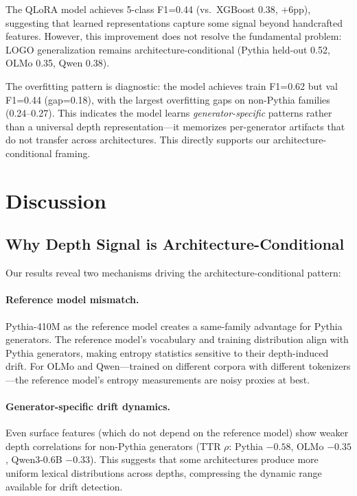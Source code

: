 \documentclass[11pt,a4paper]{article}
\begin{document}
The QLoRA model achieves 5-class F1=0.44 (vs.\ XGBoost 0.38, $+$6pp), suggesting that learned representations capture some signal beyond handcrafted features. However, this improvement does not resolve the fundamental problem: LOGO generalization remains architecture-conditional (Pythia held-out 0.52, OLMo 0.35, Qwen 0.38).

The overfitting pattern is diagnostic: the model achieves train F1=0.62 but val F1=0.44 (gap=0.18), with the largest overfitting gaps on non-Pythia families (0.24--0.27). This indicates the model learns \emph{generator-specific} patterns rather than a universal depth representation---it memorizes per-generator artifacts that do not transfer across architectures. This directly supports our architecture-conditional framing.

\section{Discussion}

\subsection{Why Depth Signal is Architecture-Conditional}

Our results reveal two mechanisms driving the architecture-conditional pattern:

\paragraph{Reference model mismatch.} Pythia-410M as the reference model creates a same-family advantage for Pythia generators. The reference model's vocabulary and training distribution align with Pythia generators, making entropy statistics sensitive to their depth-induced drift. For OLMo and Qwen---trained on different corpora with different tokenizers---the reference model's entropy measurements are noisy proxies at best.

\paragraph{Generator-specific drift dynamics.} Even surface features (which do not depend on the reference model) show weaker depth correlations for non-Pythia generators (TTR $\rho$: Pythia $-0.58$, OLMo $-0.35$, Qwen3-0.6B $-0.33$). This suggests that some architectures produce more uniform lexical distributions across depths, compressing the dynamic range available for drift detection.
\end{document}
